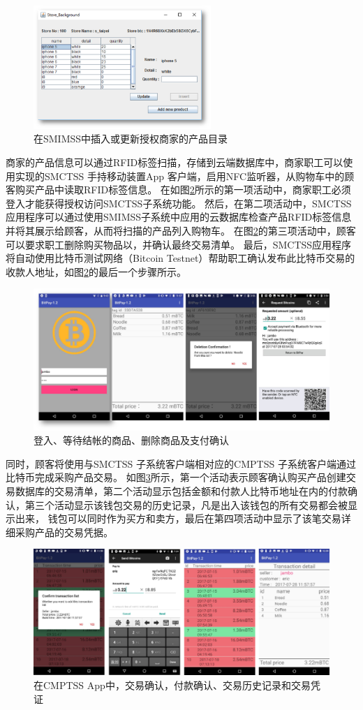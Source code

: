 \begin{figure}[!htbp]
	\centering
	\includegraphics[width = 0.6\textwidth]{fig6.png}
	\caption{在SMIMSS中插入或更新授权商家的产品目录}\label{fig6}
\end{figure}

商家的产品信息可以通过RFID标签扫描，存储到云端数据库中，商家职工可以使用实现的SMCTSS 手持移动装置App 客户端，启用NFC监听器，从购物车中的顾客购买产品中读取RFID标签信息。 在如图\ref{fig7}所示的第一项活动中，商家职工必须登入才能获得授权访问SMCTSS子系统功能。 然后，在第二项活动中，SMCTSS应用程序可以通过使用SMIMSS子系统中应用的云数据库检查产品RFID标签信息并将其展示给顾客，从而将扫描的产品列入购物车。 在图\ref{fig7}的第三项活动中，顾客可以要求职工删除购买物品以，并确认最终交易清单。 最后，SMCTSS应用程序将自动使用比特币测试网络（Bitcoin Testnet）\supercite{bitcointestnet}帮助职工确认发布此比特币交易的收款人地址，如图\ref{fig7}的最后一个步骤所示。    

\begin{figure}[!htbp]
	\centering
	\includegraphics[width = 1\textwidth]{fig7.png}
	\caption{登入、等待结帐的商品、删除商品及支付确认}\label{fig7}
\end{figure}

同时，顾客将使用与SMCTSS 子系统客户端相对应的CMPTSS 子系统客户端通过比特币完成采购产品交易。 如图\ref{fig8}所示，第一个活动表示顾客确认购买产品创建交易数据库的交易清单，第二个活动显示包括金额和付款人比特币地址在内的付款确认，第三个活动显⽰该钱包交易的历史记录，凡是出入该钱包的所有交易都会被显示出来，
钱包可以同时作为买⽅和卖⽅，最后在第四项活动中显示了该笔交易详细采购产品的交易凭据。    

\begin{figure}[!htbp]
	\centering
	\includegraphics[width = 1\textwidth]{fig8.png}
	\caption{在CMPTSS App中，交易确认，付款确认、交易历史记录和交易凭证}\label{fig8}
\end{figure}